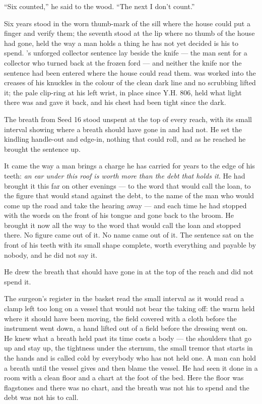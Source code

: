 “Six counted,” he said to the wood. “The next I don't count.”

Six years stood in the worn thumb-mark of the sill where the house could put a finger and verify them; the seventh stood at the lip where no thumb of the house had gone, held the way a man holds a thing he has not yet decided is his to spend. 's unforged collector sentence lay beside the knife --- the man sent for a collector who turned back at the frozen ford --- and neither the knife nor the sentence had been entered where the house could read them.  was worked into the creases of his knuckles in the colour of the clean dark line and no scrubbing lifted it; the pale clip-ring at his left wrist, in place since Y.H. 806, held what light there was and gave it back, and his chest had been tight since the dark.

The breath from Seed 16 stood unspent at the top of every reach, with its small interval showing where a breath should have gone in and had not. He set the kindling handle-out and edge-in, nothing that could roll, and as he reached he brought the sentence up.

It came the way a man brings a charge he has carried for years to the edge of his teeth: \emph{an ear under this roof is worth more than the debt that holds it}. He had brought it this far on other evenings --- to the word that would call the loan, to the figure that would stand against the debt, to the name of the man who would come up the road and take the hearing away --- and each time he had stopped with the words on the front of his tongue and gone back to the broom. He brought it now all the way to the word that would call the loan and stopped there. No figure came out of it. No name came out of it. The sentence sat on the front of his teeth with its small shape complete, worth everything and payable by nobody, and he did not say it.

He drew the breath that should have gone in at the top of the reach and did not spend it.

The surgeon's register in the basket read the small interval as it would read a clamp left too long on a vessel that would not bear the taking off: the warm held where it should have been moving, the field covered with a cloth before the instrument went down, a hand lifted out of a field before the dressing went on. He knew what a breath held past its time costs a body --- the shoulders that go up and stay up, the tightness under the sternum, the small tremor that starts in the hands and is called cold by everybody who has not held one. A man can hold a breath until the vessel gives and then blame the vessel. He had seen it done in a room with a clean floor and a chart at the foot of the bed. Here the floor was flagstones and there was no chart, and the breath was not his to spend and the debt was not his to call.

